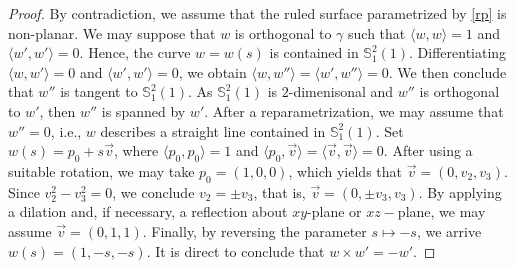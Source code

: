 \documentclass[a4paper,12pt]{amsart}
\theoremstyle{definition}
\def\s{\mathbb S}
\begin{document}
\begin{proof}
By contradiction, we assume that the ruled surface parametrized by \eqref{rp} is non-planar. We may suppose that $w$ is orthogonal to $\gamma$ such that $\langle w, w \rangle = 1$ and $\langle w',w' \rangle=0$. Hence, the curve $w=w(s)$ is contained in $\s_1^2(1)$. Differentiating $\langle w,w' \rangle=0$ and $\langle w',w' \rangle=0$, we obtain $\langle w,w'' \rangle=\langle w',w'' \rangle=0$. We then conclude that $w''$ is tangent to $ \s_1^2(1)$. As $ \s_1^2(1)$ is $2$-dimenisonal and $w''$ is orthogonal to $w'$, then $w''$ is spanned by $w'$. After a reparametrization, we may assume that $w''=0$, i.e., $w$ describes a straight line contained in $\s_1^2(1)$. Set $w(s)=p_0+s\vec{v}$, where $\langle p_0,p_0\rangle=1$ and $\langle p_0,\vec{v}\rangle=\langle \vec{v},\vec{v}\rangle=0$. After using a suitable rotation, we may take $ p_0=(1,0,0)$, which yields that $\vec{v}=(0,v_2,v_3)$. Since $v_2^2-v_3^2=0$, we conclude $v_2=\pm v_3$, that is, $\vec{v}=(0,\pm v_3,v_3)$. By applying a dilation and, if necessary, a reflection about $xy$-plane or $xz-$plane, we may assume $\vec{v}=(0,1,1)$. Finally, by reversing the parameter $s\mapsto -s$, we arrive $w(s)=(1,-s,-s)$. It is direct to conclude that $w\times w'=-w'$. 


\end{proof}
\end{document}
